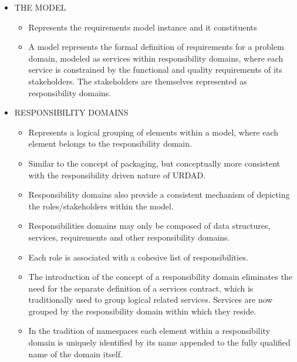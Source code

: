 \begin{itemize}
\begin{itemize}
\begin{itemize}
				\item THE MODEL
					\begin{itemize}
						\item Represents the requirements model instance and it constituents
						\item A model represents the formal definition of requirements for a problem domain, modeled as services within responsibility domains, where each service is constrained by the functional and quality requirements of its stakeholders. The stakeholders are themselves represented as responsibility domains.
					\end{itemize}
					
				\item RESPONSIBILITY DOMAINS
					\begin{itemize}
						\item Represents a logical grouping of elements within a model, where each element belongs to the responsibility domain.
						\item Similar to the concept of packaging, but conceptually more consistent with the responsibility driven nature of URDAD.
						\item Responsibility domains also provide a consistent mechanism of depicting the roles/stakeholders within the model.
						\item Responsibilities domains may only be composed of data structures, services, requirements and other responsibility domains.
						\item Each role is associated with a cohesive list of responsibilities.
						\item The introduction of the concept of a responsibility domain eliminates the need for the separate definition of a services contract, which is traditionally used to group logical related services. Services are now grouped by the responsibility domain within which they reside.
						\item In the tradition of namespaces each element within a responsibility domain is uniquely identified by its name appended to the fully qualified name of the domain itself.
					\end{itemize}
					

\end{itemize}
\end{itemize}
\end{itemize}
